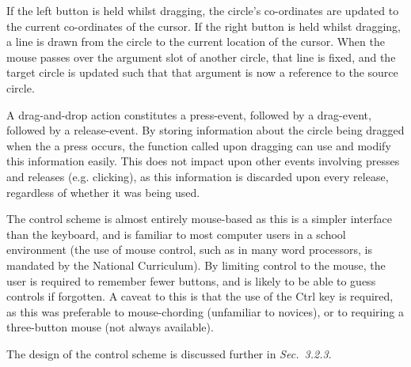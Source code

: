 \documentclass[12pt,twoside,notitlepage,xetex]{report}
\begin{document}
If the left button is held whilst dragging, the circle's co-ordinates are updated to the current co-ordinates of the cursor.  If the right button is held whilst dragging, a line is drawn from the circle to the current location of the cursor.  When the mouse passes over the argument slot of another circle, that line is fixed, and the target circle is updated such that that argument is now a reference to the source circle.

A drag-and-drop action constitutes a press-event, followed by a drag-event, followed by a release-event.  By storing information about the circle being dragged when the a press occurs, the function called upon dragging can use and modify this information easily.  This does not impact upon other events involving presses and releases (e.g. clicking), as this information is discarded upon every release, regardless of whether it was being used.

The control scheme is almost entirely mouse-based as this is a simpler interface than the keyboard, and is familiar to most computer users in a school environment (the use of mouse control, such as in many word processors, is mandated by the National Curriculum).  By limiting control to the mouse, the user is required to remember fewer buttons, and is likely to be able to guess controls if forgotten.  A caveat to this is that the use of the Ctrl key is required, as this was preferable to mouse-chording (unfamiliar to novices), or to requiring a three-button mouse (not always available).

The design of the control scheme is discussed further in \emph{Sec.~3.2.3}. %

%
%
\end{document}
